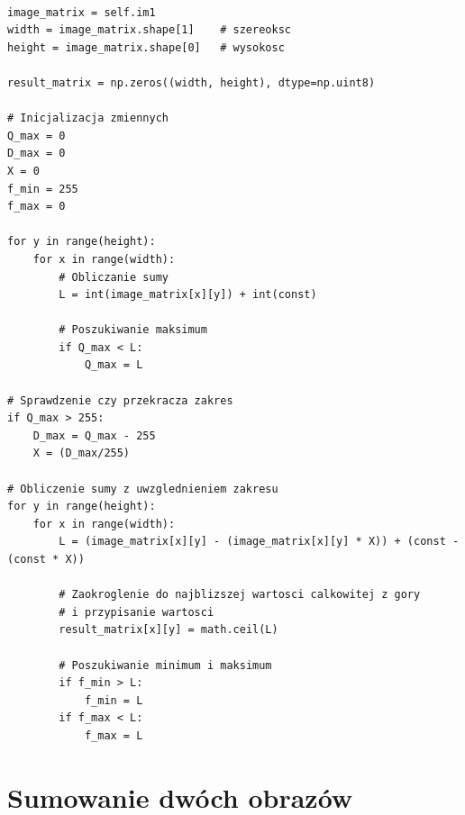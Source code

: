 \documentclass[final,a4paper,openany,12pt]{mwbk}
\begin{document}
\begin{lstlisting}[caption=Sumowanie obrazu szarego ze stałą]

image_matrix = self.im1
width = image_matrix.shape[1]    # szereoksc
height = image_matrix.shape[0]   # wysokosc

result_matrix = np.zeros((width, height), dtype=np.uint8)

# Inicjalizacja zmiennych
Q_max = 0
D_max = 0
X = 0
f_min = 255
f_max = 0

for y in range(height):
    for x in range(width):  
        # Obliczanie sumy
        L = int(image_matrix[x][y]) + int(const)

        # Poszukiwanie maksimum
        if Q_max < L:
            Q_max = L

# Sprawdzenie czy przekracza zakres
if Q_max > 255:
    D_max = Q_max - 255
    X = (D_max/255)

# Obliczenie sumy z uwzglednieniem zakresu
for y in range(height):
    for x in range(width): 
        L = (image_matrix[x][y] - (image_matrix[x][y] * X)) + (const - (const * X))

        # Zaokroglenie do najblizszej wartosci calkowitej z gory
        # i przypisanie wartosci
        result_matrix[x][y] = math.ceil(L)

        # Poszukiwanie minimum i maksimum
        if f_min > L:
            f_min = L
        if f_max < L:
            f_max = L
\end{lstlisting}



\section {Sumowanie dwóch obrazów}
\hfill
\\\\
\indent
\end{document}

